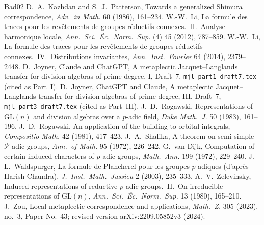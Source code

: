\documentclass[12pt]{article}
\newcommand{\GL}{\mathrm{GL}}
\theoremstyle{plain}
\theoremstyle{definition}
\begin{document}
\begin{thebibliography}{Bad02}
 D.~A.~Kazhdan and S.~J.~Patterson, Towards a generalized Shimura correspondence, \emph{Adv.\ in Math.} 60 (1986), 161--234.
 W.-W.~Li, La formule des traces pour les rev\^etements de groupes r\'eductifs connexes.\ II.\ Analyse harmonique locale, \emph{Ann.\ Sci.\ \'Ec.\ Norm.\ Sup.} (4) 45 (2012), 787--859.
 W.-W.~Li, La formule des traces pour les rev\^etements de groupes r\'eductifs connexes.\ IV.\ Distributions invariantes, \emph{Ann.\ Inst.\ Fourier} 64 (2014), 2379--2448.
 D.~Joyner, Claude and ChatGPT, A metaplectic Jacquet--Langlands transfer for division algebras of prime degree, I, Draft~7, \texttt{mjl\_part1\_draft7.tex} (cited as Part~I).
 D.~Joyner, ChatGPT and Claude, A metaplectic Jacquet--Langlands transfer for division algebras of prime degree, III, Draft~7, \texttt{mjl\_part3\_draft7.tex} (cited as Part~III).
 J.~D.~Rogawski, Representations of $\GL(n)$ and division algebras over a $p$-adic field, \emph{Duke Math.\ J.} 50 (1983), 161--196.
 J.~D.~Rogawski, An application of the building to orbital integrals, \emph{Compositio Math.} 42 (1981), 417--423.
 J.~A.~Shalika, A theorem on semi-simple $\mathcal P$-adic groups, \emph{Ann.\ of Math.} 95 (1972), 226--242.
 G.~van Dijk, Computation of certain induced characters of $p$-adic groups, \emph{Math.\ Ann.} 199 (1972), 229--240.
 J.-L.~Waldspurger, La formule de Plancherel pour les groupes $p$-adiques (d'apr\`es Harish-Chandra), \emph{J.\ Inst.\ Math.\ Jussieu} 2 (2003), 235--333.
 A.~V.~Zelevinsky, Induced representations of reductive $p$-adic groups.\ II.\ On irreducible representations of $\GL(n)$, \emph{Ann.\ Sci.\ \'Ec.\ Norm.\ Sup.} 13 (1980), 165--210.
 J.~Zou, Local metaplectic correspondence and applications, \emph{Math.\ Z.} 305 (2023), no.~3, Paper No.~43; revised version arXiv:2209.05852v3 (2024).
\end{thebibliography}
\end{document}
